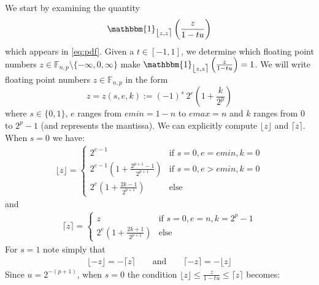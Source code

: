 \documentclass[10pt,a4paper]{article}
\theoremstyle{plain}
\theoremstyle{definition}
\newcommand{\F}[1][n,p]{\mathbb{F}_{#1}}
\newcommand{\one}{\mathbbm{1}}
\newcommand{\ceil}[1]{\lceil #1 \rceil}
\newcommand{\floor}[1]{\lfloor #1 \rfloor}
\newcommand{\fintvl}[1][x]{\mathlarger{\lfloor}#1,#1\mathlarger{\rceil}}
\begin{document}
We start by examining the quantity
\[
\one_{\fintvl[z]}\left(\frac{z}{1-tu}\right)
\]
which appears in \eqref{eq:pdf}. Given a $t\in\left[-1,1\right]$, we determine which floating point numbers $z\in\F\setminus\{-\infty,0,\infty\}$ make $\one_{\fintvl[z]}\left(\frac{z}{1-tu}\right)=1$. We will write floating point numbers $z\in\F$ in the form
\[
z=z(s,e,k):=(-1)^s ~ 2^e \left(1+\frac{k}{2^p}\right)
\]
where $s\in\{0,1\}$, $e$ ranges from $emin=1-n$ to $emax=n$ and $k$ ranges from 0 to $2^p-1$ (and represents the mantissa). We can explicitly compute $\floor{z}$ and $\ceil{z}$. When $s=0$ we have:
\begin{align}
\floor{z}=
\begin{cases}
2^{e-1} & \text{if }s=0, e=emin, k=0\\
2^{e-1}\left(1+\frac{2^{p+1}-1}{2^{p+1}}\right) & \text{if }s=0, e>emin, k=0\\
2^e\left(1+\frac{2k-1}{2^{p+1}}\right) & \text{else}
\end{cases}
\end{align}
and
\begin{align}
\ceil{z}=\begin{cases}
z&\text{if }s=0, e=n, k=2^p-1\\
2^e\left(1+\frac{2k+1}{2^{p+1}}\right) & \text{else}
\end{cases}
\end{align}
For $s=1$ note simply that
\begin{align}
\floor{-z}=-\ceil{z}\qquad\text{and}\qquad\ceil{-z}=-\floor{z}\label{eq:minz}
\end{align}
Since $u=2^{-(p+1)}$, when $s=0$ the condition $\floor{z}\leq \frac{z}{1-tu}\leq \ceil{z}$ becomes:
\end{document}
